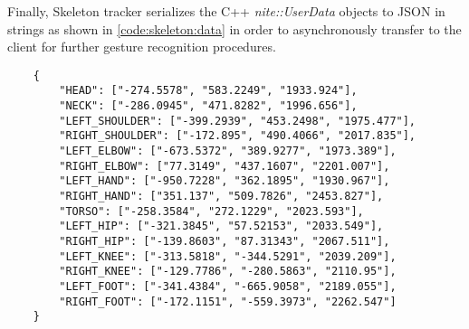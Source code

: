  Finally, Skeleton tracker serializes the C++ \textit{nite::UserData} objects to JSON in strings  as shown in \ref{code:skeleton:data} in order to asynchronously transfer to the client for further gesture recognition procedures.
 
 \begin{lstlisting}
	{
		"HEAD": ["-274.5578", "583.2249", "1933.924"],
		"NECK": ["-286.0945", "471.8282", "1996.656"],
		"LEFT_SHOULDER": ["-399.2939", "453.2498", "1975.477"],
		"RIGHT_SHOULDER": ["-172.895", "490.4066", "2017.835"],
		"LEFT_ELBOW": ["-673.5372", "389.9277", "1973.389"],
		"RIGHT_ELBOW": ["77.3149", "437.1607", "2201.007"],
		"LEFT_HAND": ["-950.7228", "362.1895", "1930.967"],
		"RIGHT_HAND": ["351.137", "509.7826", "2453.827"],
		"TORSO": ["-258.3584", "272.1229", "2023.593"],
		"LEFT_HIP": ["-321.3845", "57.52153", "2033.549"],
		"RIGHT_HIP": ["-139.8603", "87.31343", "2067.511"],
		"LEFT_KNEE": ["-313.5818", "-344.5291", "2039.209"],
		"RIGHT_KNEE": ["-129.7786", "-280.5863", "2110.95"],
		"LEFT_FOOT": ["-341.4384", "-665.9058", "2189.055"],
		"RIGHT_FOOT": ["-172.1151", "-559.3973", "2262.547"]
	}
 \end{lstlisting}
 \label{code:skeleton:data}